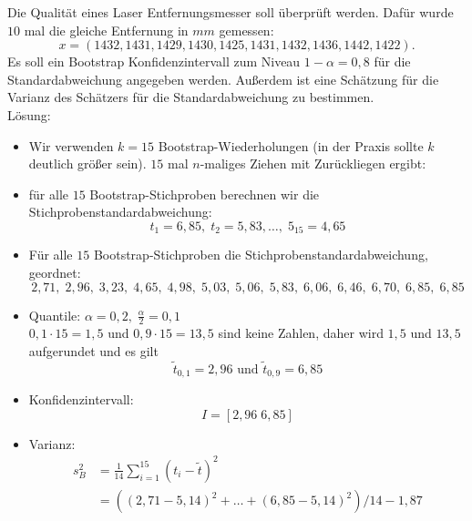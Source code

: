 \documentclass{scrreprt}
\begin{document}
 Die Qualität eines Laser Entfernungsmesser soll überprüft werden. Dafür wurde $10$ mal die gleiche Entfernung in $\unit{mm}$ gemessen:
$$x=(1432,1431,1429,1430,1425,1431,1432,1436,1442,1422)\text{.}$$
Es soll ein Bootstrap Konfidenzintervall zum Niveau $1-\alpha = 0,8$ für die Standardabweichung angegeben werden. Außerdem ist eine Schätzung für die Varianz des Schätzers für die Standardabweichung zu bestimmen.\\
Lösung:
\begin{itemize}
\item Wir verwenden $k=15$ Bootstrap-Wiederholungen (in der Praxis sollte $k$ deutlich größer sein). $15$ mal $n$-maliges Ziehen mit Zurückliegen ergibt:
\item für alle $15$ Bootstrap-Stichproben berechnen wir die Stichprobenstandardabweichung:
$$t_1=6,85, \; t_2 = 5,83,\ldots, \; 5_{15}=4,65$$
\item Für alle $15$ Bootstrap-Stichproben die Stichprobenstandardabweichung, geordnet:
$$2,71,\; 2,96, \; 3,23,\; 4,65,\; 4,98,\; 5,03,\; 5,06,\; 5,83,\; 6,06,\; 6,46,\; 6,70,\; 6,85,\; 6,85$$
\item Quantile: $\alpha = 0,2, \; \frac{\alpha}{2}=0,1$\\
$0,1 \cdot 15 = 1,5$ und $0,9 \cdot 15 = 13,5$ sind keine Zahlen, daher wird $1,5$ und $13,5$ aufgerundet und es gilt
$$\tilde{t}_{0,1}=2,96 \text{ und } \tilde{t}_{0,9}=6,85$$
\item Konfidenzintervall:
$$I=[2,96\; 6,85]$$
\item Varianz:
\begin{align*}
s_B^2&=\frac{1}{14}\sum_{i=1}^15 (t_i-\tilde{t})^2\\
&= ((2,71-5,14)^2 + \ldots + (6,85-5,14)^2)/14-1,87
\end{align*}
\end{itemize} 
\end{document}
